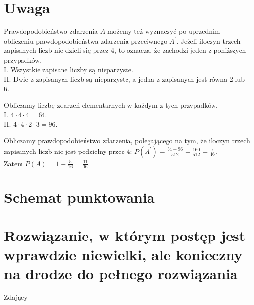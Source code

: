 \documentclass[10pt]{article}
\begin{document}
\section*{Uwaga}
Prawdopodobieństwo zdarzenia $A$ możemy też wyznaczyć po uprzednim obliczeniu prawdopodobieństwa zdarzenia przeciwnego $A^{\prime}$. Jeżeli iloczyn trzech zapisanych liczb nie dzieli się przez 4, to oznacza, że zachodzi jeden z poniższych przypadków.\\
I. Wszystkie zapisane liczby są nieparzyste.\\
II. Dwie z zapisanych liczb są nieparzyste, a jedna z zapisanych jest równa 2 lub 6.

Obliczamy liczbę zdarzeń elementarnych w każdym z tych przypadków.\\
I. $4 \cdot 4 \cdot 4=64$.\\
II. $4 \cdot 4 \cdot 2 \cdot 3=96$.

Obliczamy prawdopodobieństwo zdarzenia, polegającego na tym, że iloczyn trzech zapisanych liczb nie jest podzielny przez 4: $P\left(A^{\prime}\right)=\frac{64+96}{512}=\frac{160}{512}=\frac{5}{16}$.\\
Zatem $P(A)=1-\frac{5}{16}=\frac{11}{16}$.

\section*{Schemat punktowania}
\section*{Rozwiązanie, w którym postęp jest wprawdzie niewielki, ale konieczny na drodze do pełnego rozwiązania}
Zdający
\end{document}
